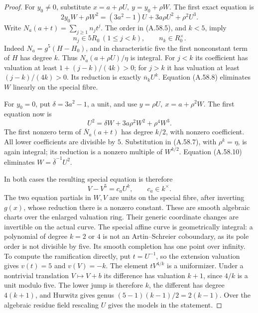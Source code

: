 \begin{proof}
For \(y_0\ne0\), substitute
\(x=a+\rho U,\ y=y_0+\rho W\). The first exact equation is
\[
 2y_0W+\rho W^2
       =(3a^2-1)U+3a\rho U^2+\rho^2U^3.               \tag{A.58.8}
\]
Write \(N_a(a+t)=\sum_{j\ge1}n_jt^j\). The order
in (A.58.5), and \(k<5\), imply
\[
 n_j\in5R_0\ (1\le j<k),\qquad n_k\in R_0^\times.
                                                        \tag{A.58.9}
\]
Indeed \(N_a=g^5(H-H_0)\), and in characteristic five
the first nonconstant term of \(H\) has degree \(k\).
Thus \(N_a(a+\rho U)/\eta\) is integral. For \(j<k\)
its coefficient has valuation at least
\(1+(j-k)/(4k)>0\); for \(j>k\) it has valuation
at least \((j-k)/(4k)>0\). Its reduction is exactly
\(\overline n_k U^k\). Equation (A.58.8) eliminates
\(W\) linearly on the special fibre.

For \(y_0=0\), put \(\delta=3a^2-1\), a unit, and use
\(y=\rho U,\ x=a+\rho^2W\). The first equation now is
\[
           U^2=\delta W+3a\rho^2W^2+\rho^4W^3.        \tag{A.58.10}
\]
The first nonzero term of \(\overline N_a(a+t)\) has
degree \(k/2\), with nonzero coefficient. All lower
coefficients are divisible by \(5\). Substitution in
(A.58.7), with \(\rho^k=\eta\), is again integral;
its reduction is a nonzero multiple of \(W^{k/2}\).
Equation (A.58.10) eliminates
\(W=\overline\delta^{-1}U^2\).

In both cases the resulting special equation is therefore
\[
                         V-V^5=c_aU^k,
                         \qquad c_a\in k^\times.      \tag{A.58.11}
\]
The two equation partials in \(W,V\) are units on the
special fibre, after inverting \(g(x)\), whose reduction
there is a nonzero constant. These are smooth algebraic
charts over the enlarged valuation ring. Their generic
coordinate changes are invertible on the actual curve.
The special affine curve is geometrically integral: a
polynomial of degree \(k=2\) or \(4\) is not an
Artin--Schreier coboundary, as its pole order is not
divisible by five. Its smooth completion has one point
over infinity. To compute the ramification directly, put
\(t=U^{-1}\), so the extension valuation gives
\(v(t)=5\) and \(v(V)=-k\). The element
\(tV^{4/k}\) is a uniformizer. Under a nontrivial
translation \(V\mapsto V+b\) its difference has
valuation \(k+1\), since \(4/k\) is a unit modulo
five. The lower jump is therefore \(k\), the different
has degree \(4(k+1)\), and Hurwitz gives genus
\((5-1)(k-1)/2=2(k-1)\). Over the algebraic residue
field rescaling \(U\) gives the models in the statement.


\end{proof}
